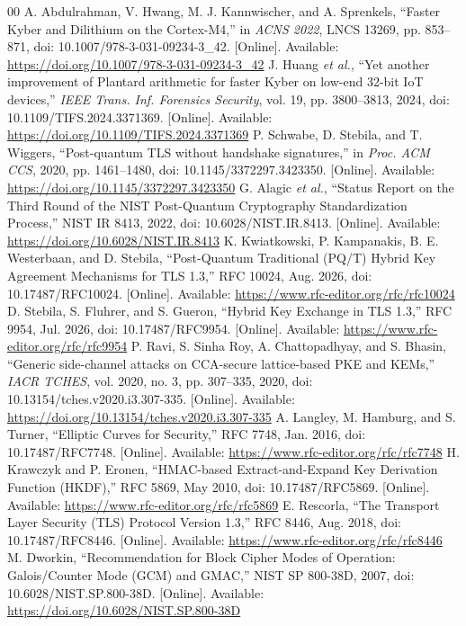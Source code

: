 \documentclass[journal, 10pt]{IEEEtran}
\begin{document}
\begin{thebibliography}{00}
 A. Abdulrahman, V. Hwang, M. J. Kannwischer, and A. Sprenkels, ``Faster Kyber and Dilithium on the Cortex-M4,'' in \textit{ACNS 2022}, LNCS 13269, pp. 853--871, doi: 10.1007/978-3-031-09234-3\_42. [Online]. Available: \url{https://doi.org/10.1007/978-3-031-09234-3_42}
 J. Huang \textit{et al.}, ``Yet another improvement of Plantard arithmetic for faster Kyber on low-end 32-bit IoT devices,'' \textit{IEEE Trans. Inf. Forensics Security}, vol. 19, pp. 3800--3813, 2024, doi: 10.1109/TIFS.2024.3371369. [Online]. Available: \url{https://doi.org/10.1109/TIFS.2024.3371369}
 P. Schwabe, D. Stebila, and T. Wiggers, ``Post-quantum TLS without handshake signatures,'' in \textit{Proc. ACM CCS}, 2020, pp. 1461--1480, doi: 10.1145/3372297.3423350. [Online]. Available: \url{https://doi.org/10.1145/3372297.3423350}
 G. Alagic \textit{et al.}, ``Status Report on the Third Round of the NIST Post-Quantum Cryptography Standardization Process,'' NIST IR 8413, 2022, doi: 10.6028/NIST.IR.8413. [Online]. Available: \url{https://doi.org/10.6028/NIST.IR.8413}
 K. Kwiatkowski, P. Kampanakis, B. E. Westerbaan, and D. Stebila, ``Post-Quantum Traditional (PQ/T) Hybrid Key Agreement Mechanisms for TLS 1.3,'' RFC 10024, Aug. 2026, doi: 10.17487/RFC10024. [Online]. Available: \url{https://www.rfc-editor.org/rfc/rfc10024}
 D. Stebila, S. Fluhrer, and S. Gueron, ``Hybrid Key Exchange in TLS 1.3,'' RFC 9954, Jul. 2026, doi: 10.17487/RFC9954. [Online]. Available: \url{https://www.rfc-editor.org/rfc/rfc9954}
 P. Ravi, S. Sinha Roy, A. Chattopadhyay, and S. Bhasin, ``Generic side-channel attacks on CCA-secure lattice-based PKE and KEMs,'' \textit{IACR TCHES}, vol. 2020, no. 3, pp. 307--335, 2020, doi: 10.13154/tches.v2020.i3.307-335. [Online]. Available: \url{https://doi.org/10.13154/tches.v2020.i3.307-335}
 A. Langley, M. Hamburg, and S. Turner, ``Elliptic Curves for Security,'' RFC 7748, Jan. 2016, doi: 10.17487/RFC7748. [Online]. Available: \url{https://www.rfc-editor.org/rfc/rfc7748}
 H. Krawczyk and P. Eronen, ``HMAC-based Extract-and-Expand Key Derivation Function (HKDF),'' RFC 5869, May 2010, doi: 10.17487/RFC5869. [Online]. Available: \url{https://www.rfc-editor.org/rfc/rfc5869}
 E. Rescorla, ``The Transport Layer Security (TLS) Protocol Version 1.3,'' RFC 8446, Aug. 2018, doi: 10.17487/RFC8446. [Online]. Available: \url{https://www.rfc-editor.org/rfc/rfc8446}
 M. Dworkin, ``Recommendation for Block Cipher Modes of Operation: Galois/Counter Mode (GCM) and GMAC,'' NIST SP 800-38D, 2007, doi: 10.6028/NIST.SP.800-38D. [Online]. Available: \url{https://doi.org/10.6028/NIST.SP.800-38D}

\end{thebibliography}
\end{document}
